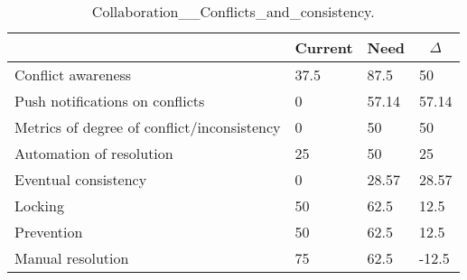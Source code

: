 
  \begin{table*}[]
  \centering
  \notsotiny
  \caption{ Collaboration__Conflicts_and_consistency.}
\label{tab:collaboration__conflicts_and_consistency}
\begin{tabular}{|l|l|l|l|}
  \hline
  \rowcolor[HTML]{C0C0C0}
    \multicolumn{1}{|c|}{Feature} & \multicolumn{1}{c|}{Current} & \multicolumn{1}{c|}{Need} & \multicolumn{1}{c|}{$\Delta$} \\ \hline
  Conflict awareness & 37.5 & 87.5 & 50 \\ \hline 
Push notifications on conflicts & 0 & 57.14 & 57.14 \\ \hline 
Metrics of degree of conflict/inconsistency & 0 & 50 & 50 \\ \hline 
Automation of resolution & 25 & 50 & 25 \\ \hline 
Eventual consistency & 0 & 28.57 & 28.57 \\ \hline 
Locking & 50 & 62.5 & 12.5 \\ \hline 
Prevention & 50 & 62.5 & 12.5 \\ \hline 
Manual resolution & 75 & 62.5 & -12.5 \\ \hline 
\end{tabular}%
  \end{table*}